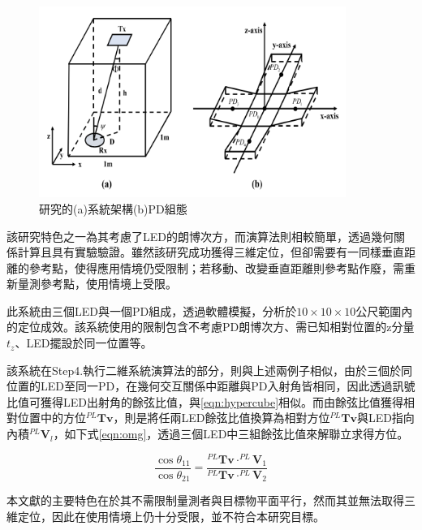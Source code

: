 \begin{description}
        \begin{figure}[htpb]
            \centering
            \includegraphics[width=10cm]{ch2pic/case_cart3d.png}
            \caption{\cite{case:cart3d}研究的(a)系統架構(b)PD組態}
            \label{pic:case_cart3d}
        \end{figure}

        該研究特色之一為其考慮了LED的朗博次方，而演算法則相較簡單，透過幾何關係計算且具有實驗驗證。雖然該研究成功獲得三維定位，但卻需要有一同樣垂直距離的參考點，使得應用情境仍受限制；若移動、改變垂直距離則參考點作廢，需重新量測參考點，使用情境上受限。



        \item[\cite{omg_new}]\hfill
        
        此系統由三個LED與一個PD組成，透過軟體模擬，分析於$10\times 10\times 10$公尺範圍內的定位成效。該系統使用的限制包含不考慮PD朗博次方、需已知相對位置的z分量$t_z$、LED擺設於同一位置等。

        該系統在Step4.執行二維系統演算法的部分，則與上述兩例子相似，由於三個於同位置的LED至同一PD，在幾何交互關係中距離與PD入射角皆相同，因此透過訊號比值可獲得LED出射角的餘弦比值，與\ref{eqn:hypercube}相似。而由餘弦比值獲得相對位置中的方位$^{PL}\boldsymbol{Tv}$，則是將任兩LED餘弦比值換算為相對方位$^{PL}\boldsymbol{Tv}$與LED指向內積$^{PL}\boldsymbol{V}_l$，如下式\ref{eqn:omg}，透過三個LED中三組餘弦比值來解聯立求得方位。
        
        \begin{equation}
            \label{eqn:omg}
            \frac{\cos\theta_{11}}{\cos\theta_{21}}=\frac{^{PL}\boldsymbol{Tv}\cdot^{PL}\boldsymbol{V}_1 }{^{PL}\boldsymbol{Tv}\cdot^{PL}\boldsymbol{V}_2 }
        \end{equation}

        本文獻的主要特色在於其不需限制量測者與目標物平面平行，然而其並無法取得三維定位，因此在使用情境上仍十分受限，並不符合本研究目標。
        
        

    \end{description}

